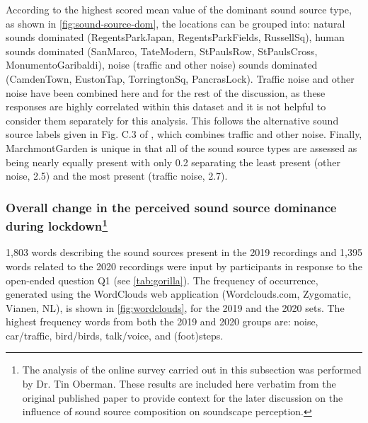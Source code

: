    According to the highest scored mean value of the dominant sound source type, as shown in \cref{fig:sound-source-dom}, the locations can be grouped into: natural sounds dominated (RegentsParkJapan, RegentsParkFields, RussellSq), human sounds dominated (SanMarco, TateModern, StPaulsRow, StPaulsCross, MonumentoGaribaldi), noise (traffic and other noise) sounds dominated (CamdenTown, EustonTap, TorringtonSq, PancrasLock). Traffic noise and other noise have been combined here and for the rest of the discussion, as these responses are highly correlated within this dataset and it is not helpful to consider them separately for this analysis. This follows the alternative sound source labels given in Fig. C.3 of \citet{ISO12913Part2}, which combines traffic and other noise. Finally, MarchmontGarden is unique in that all of the sound source types are assessed as being nearly equally present with only 0.2 separating the least present (other noise, 2.5) and the most present (traffic noise, 2.7).

   \subsubsection[Overall change in the perceived sound source dominance during lockdown]{Overall change in the perceived sound source dominance during lockdown\footnote{The analysis of the online survey carried out in this subsection was performed by Dr. Tin Oberman. These results are included here verbatim from the original published paper to provide context for the later discussion on the influence of sound source composition on soundscape perception.}}
   \label{sec:soundSourceTin}

    1,803 words describing the sound sources present in the 2019 recordings and 1,395 words related to the 2020 recordings were input by participants in response to the open-ended question Q1 (see \cref{tab:gorilla}). The frequency of occurrence, generated using the WordClouds web application (Wordclouds.com, Zygomatic, Vianen, NL), is shown in \cref{fig:wordclouds}, for the 2019 and the 2020 sets. The highest frequency words from both the 2019 and 2020 groups are: noise, car/traffic, bird/birds, talk/voice, and (foot)steps.


